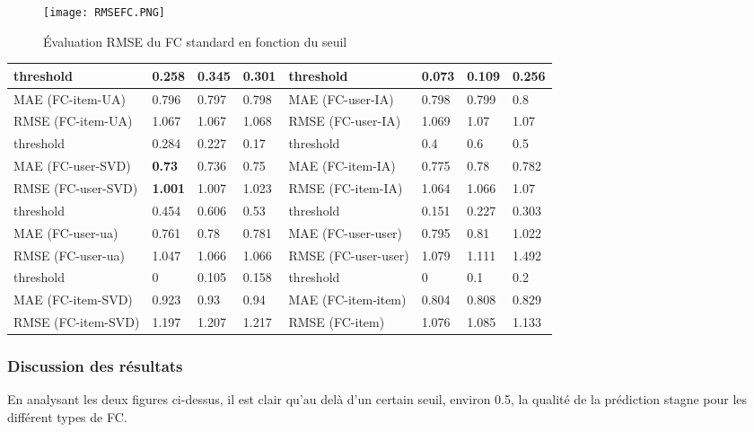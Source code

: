 \begin{figure}[H]
		\centering
	\texttt{[image: RMSEFC.PNG]}
	\caption{Évaluation RMSE du FC standard en fonction du seuil}
	\label{fig:FCRMSE}
\end{figure}

\begin{center}\label{tab1}
	\begin{tabularx}{\textwidth}{|p{3.7cm}|l|l|l||p{3.65cm}|l|l|l|}
		\hline
		threshold & 0.258 & 0.345 & 0.301 & threshold & 0.073 & 0.109 & 0.256 \\ \hline
		MAE  (FC-item-UA) & 0.796 & 0.797 & 0.798 & MAE  (FC-user-IA) & 0.798 & 0.799 & 0.8 \\ \hline
		RMSE (FC-item-UA) & 1.067 & 1.067 & 1.068 & RMSE (FC-user-IA) & 1.069 & 1.07 & 1.07 \\ \hline\hline
		threshold & 0.284 & 0.227 & 0.17 & threshold & 0.4 & 0.6 & 0.5 \\ \hline
		MAE  (FC-user-SVD) & \textbf{0.73} & 0.736 & 0.75 & MAE  (FC-item-IA) & 0.775 & 0.78 & 0.782 \\ \hline
		RMSE (FC-user-SVD) & \textbf{1.001} & 1.007 & 1.023 & RMSE (FC-item-IA) & 1.064 & 1.066 & 1.07 \\ \hline\hline
		threshold & 0.454 & 0.606 & 0.53 & threshold & 0.151 & 0.227 & 0.303 \\ \hline
		MAE  (FC-user-ua) & 0.761 & 0.78 & 0.781 & MAE  (FC-user-user) & 0.795 & 0.81 & 1.022 \\ \hline
		RMSE (FC-user-ua) & 1.047 & 1.066 & 1.066 & RMSE (FC-user-user) & 1.079 & 1.111 & 1.492 \\ \hline\hline
		threshold & 0 & 0.105 & 0.158 & threshold & 0 & 0.1 & 0.2 \\ \hline
		MAE  (FC-item-SVD) & 0.923 & 0.93 & 0.94 & MAE  (FC-item-item) & 0.804 & 0.808 & 0.829 \\ \hline
		RMSE (FC-item-SVD) & 1.197 & 1.207 & 1.217 & RMSE (FC-item) & 1.076 & 1.085 & 1.133 \\ \hline
	\end{tabularx}	
\end{center}
\subsubsection*{Discussion des résultats}
En analysant les deux figures ci-dessus, il est clair qu’au delà d’un certain seuil, environ 0.5, la qualité de la prédiction stagne pour les différent types de FC.


